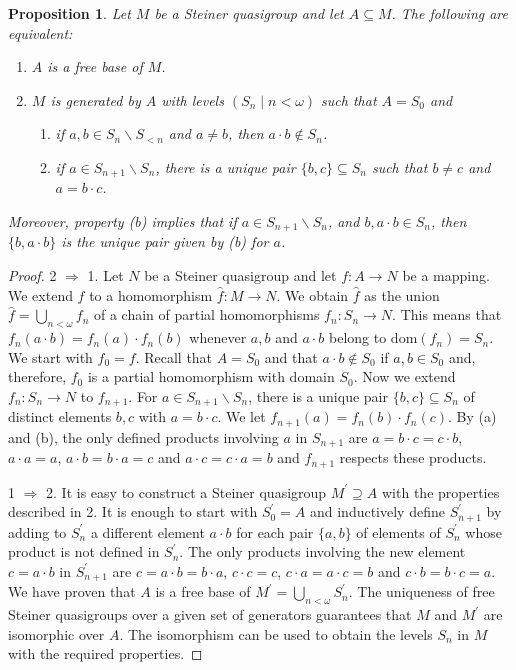 \documentclass[a4paper, 11pt]{article}
\theoremstyle{note}
\newtheorem{prop}[thm]{Proposition}
\begin{document}
	
	\begin{prop}\label{May12_2} Let $M$ be a Steiner quasigroup and let $A\subseteq M$. The following are equivalent:
		\begin{enumerate}
			\item $A$ is a free base of $M$.
			\item $M$ is generated by $A$ with  levels $(S_n\mid n<\omega)$ such that $A=S_0$ and
			\begin{enumerate}
				\item if $a,b\in S_n\smallsetminus S_{<n}$ and $a\neq b$, then $a\cdot b\not\in S_n$.
				\item if $a\in S_{n+1}\smallsetminus S_n$, there is a unique pair $\{b,c\}\subseteq S_n$ such that $b\neq c$ and $a= b\cdot c$.
			\end{enumerate}
		\end{enumerate}
		Moreover, property (b) implies that if  $a\in S_{n+1}\smallsetminus S_n$, and $b, a\cdot b\in S_n$, then  $\{b,a\cdot b\}$ is the unique pair given by (b) for  $a$.
	\end{prop}
	\begin{proof} 2 $\Rightarrow$ 1.  Let $N$ be a Steiner quasigroup and let $f:A\rightarrow N$ be a mapping. We extend $f$ to a homomorphism $\hat{f}: M\rightarrow N$.  We obtain $\hat{f}$ as the union $\hat{f}= \bigcup_{n<\omega}f_n$  of a chain  of partial homomorphisms $f_n : S_n \to N$. This means that  $f_n(a\cdot b)= f_n(a)\cdot f_n(b)$  whenever $a,b$ and $a\cdot b$  belong to $\mathrm{dom} (f_n)=S_n$. We start with $f_0=f$.  Recall that $A=S_0$ and that $a\cdot b\not\in S_0$  if $a,b\in S_0$ and, therefore, $f_0$ is a partial homomorphism with domain $S_0$. Now we extend  $f_n:S_n\rightarrow N$  to $f_{n+1}$. %
	For $a \in S_{n+1}\smallsetminus S_n$, there is a unique pair $\{b,c\}\subseteq S_n$ of distinct elements $b,c$ with $a=b\cdot c$. We let  $f_{n+1}(a) = f_n(b)\cdot f_n(c)$.  By (a) and (b), the only defined products involving $a$ in $S_{n+1}$ are   $a=b\cdot c=c\cdot b$, $a\cdot a=a$, $a\cdot b = b\cdot a= c$ and $a\cdot c= c\cdot a =b$ and $f_{n+1}$ respects these products.
		
		1 $\Rightarrow$ 2.  It is easy to construct a Steiner quasigroup $M^\prime\supseteq A $ with the properties described in 2. It is enough to start with $S^\prime_0=A$ and inductively define $S^\prime_{n+1}$ by adding to $S^\prime_n$ a different element $a\cdot b$ for each pair $\{a,b\}$ of elements of $S^\prime_n$ whose product is not defined in $S^\prime_n$. The only  products involving  the new element $c=a\cdot b$ in $S^\prime_{n+1}$ are $c=a\cdot b=b\cdot a$, $c\cdot c=c$, $c\cdot a= a\cdot c=b$ and $c\cdot b=b\cdot c= a$. We have proven that $A$ is a free base of $M^\prime= \bigcup_{n<\omega}S^\prime_n$. The uniqueness of free  Steiner quasigroups over a given set of generators guarantees that $M$ and $M^\prime$ are isomorphic over $A$.  The isomorphism can be used to obtain the levels $S_n$ in $M$ with the required properties.
	\end{proof}
	
\end{document}
